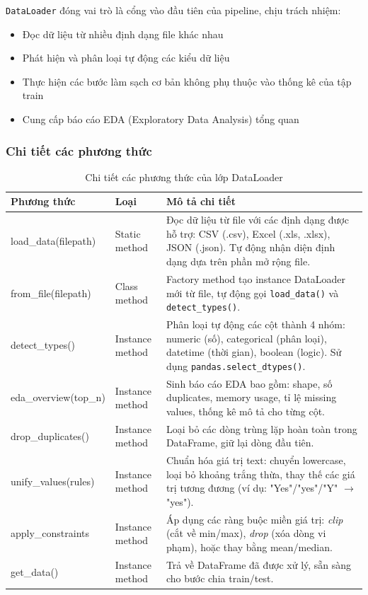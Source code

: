 \documentclass[12pt,a4paper]{article}
\begin{document}
\texttt{DataLoader} đóng vai trò là cổng vào đầu tiên của pipeline, chịu trách nhiệm:
\begin{itemize}
    \item Đọc dữ liệu từ nhiều định dạng file khác nhau
    \item Phát hiện và phân loại tự động các kiểu dữ liệu
    \item Thực hiện các bước làm sạch cơ bản không phụ thuộc vào thống kê của tập train
    \item Cung cấp báo cáo EDA (Exploratory Data Analysis) tổng quan
\end{itemize}

\subsubsection{Chi tiết các phương thức}

\begin{table}[H]
\centering
\caption{Chi tiết các phương thức của lớp DataLoader}
\label{tab:dataloader_methods}

\renewcommand{\arraystretch}{1.2}

\begin{tabular}{|>{\raggedright\arraybackslash\ttfamily}p{4cm}|
                >{\raggedright\arraybackslash}p{3cm}|
                >{\raggedright\arraybackslash}p{7.5cm}|}
\hline
\textbf{Phương thức} & \textbf{Loại} & \textbf{Mô tả chi tiết} \\
\hline
load\_data(filepath) & Static method &
Đọc dữ liệu từ file với các định dạng được hỗ trợ: CSV (.csv), Excel (.xls, .xlsx), JSON (.json).
Tự động nhận diện định dạng dựa trên phần mở rộng file. \\
\hline
from\_file(filepath) & Class method &
Factory method tạo instance DataLoader mới từ file, tự động gọi \texttt{load\_data()} và \texttt{detect\_types()}. \\
\hline
detect\_types() & Instance method &
Phân loại tự động các cột thành 4 nhóm: numeric (số), categorical (phân loại), datetime (thời gian), boolean (logic).
Sử dụng \texttt{pandas.select\_dtypes()}. \\
\hline
eda\_overview(top\_n) & Instance method &
Sinh báo cáo EDA bao gồm: shape, số duplicates, memory usage, tỉ lệ missing values, thống kê mô tả cho từng cột. \\
\hline
drop\_duplicates() & Instance method &
Loại bỏ các dòng trùng lặp hoàn toàn trong DataFrame, giữ lại dòng đầu tiên. \\
\hline
unify\_values(rules) & Instance method &
Chuẩn hóa giá trị text: chuyển lowercase, loại bỏ khoảng trắng thừa, thay thế các giá trị tương đương
(ví dụ: "Yes"/"yes"/"Y" $\rightarrow$ "yes"). \\
\hline
apply\_constraints  & Instance method &
Áp dụng các ràng buộc miền giá trị: \emph{clip} (cắt về min/max), \emph{drop} (xóa dòng vi phạm),
hoặc thay bằng mean/median. \\
\hline
get\_data() & Instance method &
Trả về DataFrame đã được xử lý, sẵn sàng cho bước chia train/test. \\
\hline
\end{tabular}
\end{table}
\end{document}
